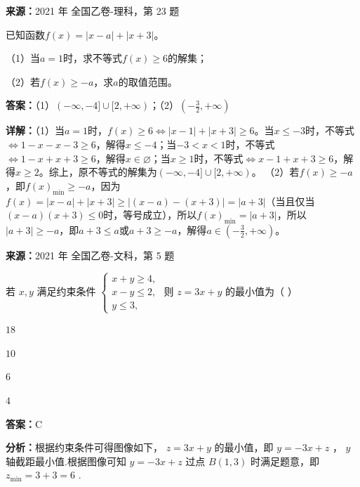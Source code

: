 \begin{question}[points=10]
\textbf{来源：}2021 年 全国乙卷-理科，第 23 题\par
已知函数$f(x)=|x-a|+|x+3|$。

（1）当$a=1$时，求不等式$f(x)\geq6$的解集；

（2）若$f(x)\geq -a$，求$a$的取值范围。
\begin{solution}
\textbf{答案：}（1）$(-\infty,-4]\cup[2,+\infty)$；（2）$\left(-\frac32,+\infty\right)$

\textbf{详解：}（1）当$a=1$时，$f(x)\geq6\Leftrightarrow|x-1|+|x+3|\geq6$。当$x\leq-3$时，不等式$\Leftrightarrow1-x-x-3\geq6$，解得$x\leq-4$；当$-3<x<1$时，不等式$\Leftrightarrow1-x+x+3\geq6$，解得$x\in\varnothing$；当$x\geq1$时，不等式$\Leftrightarrow x-1+x+3\geq6$，解得$x\geq2$。综上，原不等式的解集为$(-\infty,-4]\cup[2,+\infty)$。
（2）若$f(x)\geq -a$，即$f(x)_{\min}\geq -a$，因为$f(x)=|x-a|+|x+3|\geq|(x-a)-(x+3)|=|a+3|$（当且仅当$(x-a)(x+3)\leq0$时，等号成立），所以$f(x)_{\min}=|a+3|$，所以$|a+3|\geq -a$，即$a+3\leq a$或$a+3\geq -a$，解得$a\in\left(-\frac32,+\infty\right)$。
\end{solution}
\end{question}

\begin{question}[points=5]
\textbf{来源：}2021 年 全国乙卷-文科，第 5 题\par
若 $x,y$ 满足约束条件 $\begin{cases} x + y \ge 4, \\ x - y \le 2, \\ y \le 3, \end{cases}$ 则 $z = 3x + y$ 的最小值为（ ）
\begin{choices}
  \item $18$
  \item $10$
  \item $6$
  \item $4$
\end{choices}
\begin{solution}
\textbf{答案：}C

\textbf{分析：}根据约束条件可得图像如下， $z = 3x + y$ 的最小值，即 $y = -3x + z$ ， $y$ 轴截距最小值.根据图像可知 $y = -3x + z$ 过点 $B(1,3)$ 时满足题意，即 $z_{\min} = 3 + 3 = 6$ .
\end{solution}
\end{question}

